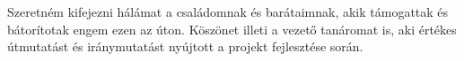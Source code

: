 \chapter*{\koszonetnyilvanitas}

Szeretném kifejezni hálámat a családomnak és barátaimnak, akik támogattak és bátorítotak engem ezen az úton. Köszönet illeti a vezető tanáromat is, aki értékes útmutatást és iránymutatást nyújtott a projekt fejlesztése során.